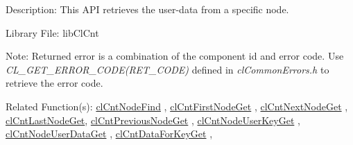\begin{Desc}
\item[Description:]This API retrieves the user-data from a specific node.\end{Desc}
\begin{Desc}
\item[Library File:]lib\-Cl\-Cnt\end{Desc}
\begin{Desc}
\item[Note:]Returned error is a combination of the component id and error code. Use \textit{CL\_\-GET\_\-ERROR\_\-CODE(RET\_\-CODE)} defined in \textit{clCommonErrors.h} to retrieve the error code.\end{Desc}
\begin{Desc}
\item[Related Function(s):]\hyperlink{pagecnt109}{cl\-Cnt\-Node\-Find} , \hyperlink{pagecnt110}{cl\-Cnt\-First\-Node\-Get} , 
\hyperlink{pagecnt112}{cl\-Cnt\-Next\-Node\-Get} , \hyperlink{pagecnt111}{cl\-Cnt\-Last\-Node\-Get}, 
\hyperlink{pagecnt113}{cl\-Cnt\-Previous\-Node\-Get} , \hyperlink{pagecnt115}{cl\-Cnt\-Node\-User\-Key\-Get} , 
\hyperlink{pagecnt117}{cl\-Cnt\-Node\-User\-Data\-Get} , \hyperlink{pagecnt116}{cl\-Cnt\-Data\-For\-Key\-Get} , \end{Desc}


\newpage
